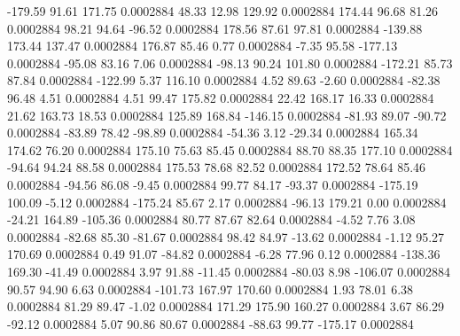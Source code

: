      -179.59       91.61      171.75     0.0002884
       48.33       12.98      129.92     0.0002884
      174.44       96.68       81.26     0.0002884
       98.21       94.64      -96.52     0.0002884
      178.56       87.61       97.81     0.0002884
     -139.88      173.44      137.47     0.0002884
      176.87       85.46        0.77     0.0002884
       -7.35       95.58     -177.13     0.0002884
      -95.08       83.16        7.06     0.0002884
      -98.13       90.24      101.80     0.0002884
     -172.21       85.73       87.84     0.0002884
     -122.99        5.37      116.10     0.0002884
        4.52       89.63       -2.60     0.0002884
      -82.38       96.48        4.51     0.0002884
        4.51       99.47      175.82     0.0002884
       22.42      168.17       16.33     0.0002884
       21.62      163.73       18.53     0.0002884
      125.89      168.84     -146.15     0.0002884
      -81.93       89.07      -90.72     0.0002884
      -83.89       78.42      -98.89     0.0002884
      -54.36        3.12      -29.34     0.0002884
      165.34      174.62       76.20     0.0002884
      175.10       75.63       85.45     0.0002884
       88.70       88.35      177.10     0.0002884
      -94.64       94.24       88.58     0.0002884
      175.53       78.68       82.52     0.0002884
      172.52       78.64       85.46     0.0002884
      -94.56       86.08       -9.45     0.0002884
       99.77       84.17      -93.37     0.0002884
     -175.19      100.09       -5.12     0.0002884
     -175.24       85.67        2.17     0.0002884
      -96.13      179.21        0.00     0.0002884
      -24.21      164.89     -105.36     0.0002884
       80.77       87.67       82.64     0.0002884
       -4.52        7.76        3.08     0.0002884
      -82.68       85.30      -81.67     0.0002884
       98.42       84.97      -13.62     0.0002884
       -1.12       95.27      170.69     0.0002884
        0.49       91.07      -84.82     0.0002884
       -6.28       77.96        0.12     0.0002884
     -138.36      169.30      -41.49     0.0002884
        3.97       91.88      -11.45     0.0002884
      -80.03        8.98     -106.07     0.0002884
       90.57       94.90        6.63     0.0002884
     -101.73      167.97      170.60     0.0002884
        1.93       78.01        6.38     0.0002884
       81.29       89.47       -1.02     0.0002884
      171.29      175.90      160.27     0.0002884
        3.67       86.29      -92.12     0.0002884
        5.07       90.86       80.67     0.0002884
      -88.63       99.77     -175.17     0.0002884
